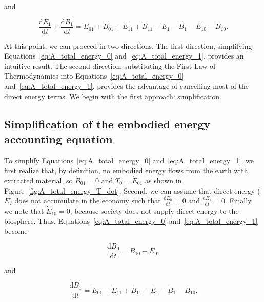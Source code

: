 \noindent and

\begin{equation} \label{eq:A_total_energy_1}
	\frac{\mathrm{d}E_{1}}{\mathrm{d}t} 
	+ \frac{\mathrm{d}B_{1}}{\mathrm{d}t} 
	= \dot{E}_{01} 
	+ \dot{B}_{01} 
	+ \dot{E}_{11}
	+ \dot{B}_{11}
	- \dot{E}_{1}
	- \dot{B}_{1}
	- \dot{E}_{10}
	- \dot{B}_{10}.	
\end{equation}

At this point, we can proceed in two directions.
The first direction, 
simplifying Equations~\ref{eq:A_total_energy_0} 
and~\ref{eq:A_total_energy_1}, 
provides an intuitive result. 
The second direction,
substituting the First Law of Thermodynamics into 
Equations~\ref{eq:A_total_energy_0} 
and~\ref{eq:A_total_energy_1}, 
provides the advantage of cancelling most of the direct energy terms.
We begin with the first approach: simplification.


\subsection{Simplification of the embodied energy accounting equation} %
\label{sec:A_simplified_embodied}

To simplify Equations~\ref{eq:A_total_energy_0} 
and~\ref{eq:A_total_energy_1},
we first realize that, by definition, no embodied energy flows from 
the earth with extracted material, so $\dot{B}_{01} = 0$
and $\dot{T}_{0} = \dot{E}_{01}$ as shown in Figure~\ref{fig:A_total_energy_T_dot}.
Second, we can assume that direct energy ($E$) does not accumulate
in the economy such that 
$\frac{\mathrm{d}E_0}{\mathrm{d}t} = 0$ and
$\frac{\mathrm{d}E_1}{\mathrm{d}t} = 0$.
Finally, we note that $\dot{E}_{10} = 0$, 
because society does not supply direct energy 
to the biosphere. Thus, Equations~\ref{eq:A_total_energy_0}
and~\ref{eq:A_total_energy_1} become

\begin{equation} \label{eq:A_total_energy_0_simp}
	\frac{\mathrm{d}B_{0}}{\mathrm{d}t} 
	= \dot{B}_{10} 
	- \dot{E}_{01}
\end{equation}

\noindent and

\begin{equation} \label{eq:A_total_energy_1_simp}
	\frac{\mathrm{d}B_{1}}{\mathrm{d}t} 
	= \dot{E}_{01} 
	+ \dot{E}_{11}
	+ \dot{B}_{11}
	- \dot{E}_{1}
	- \dot{B}_{1}
	- \dot{B}_{10}.	
\end{equation}

